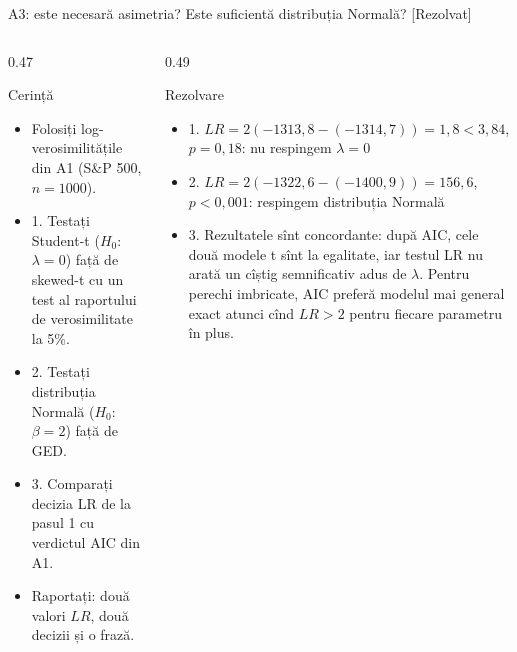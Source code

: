 \begin{frame}{A3: este necesară asimetria? Este suficientă distribuția Normală? [Rezolvat]}
\itemsize{\scriptsize}
\begin{columns}[T]
\begin{column}{0.47\textwidth}
\begin{block}{Cerință}
\begin{itemize}
    \item Folosiți log-verosimilitățile din A1 (S\&P 500, $n = 1000$).
    \item 1. Testați Student-t ($H_0$: $\lambda = 0$) față de skewed-t cu un test al raportului de verosimilitate la 5\%.
    \item 2. Testați distribuția Normală ($H_0$: $\beta = 2$) față de GED.
    \item 3. Comparați decizia LR de la pasul 1 cu verdictul AIC din A1.
    \item Raportați: două valori $LR$, două decizii și o frază.
\end{itemize}
\end{block}
\end{column}
\begin{column}{0.49\textwidth}
\begin{exampleblock}{Rezolvare}
\begin{itemize}
    \item 1. $LR = 2(-1313{,}8 - (-1314{,}7)) = 1{,}8 < 3{,}84$, $p = 0{,}18$: nu respingem $\lambda = 0$
    \item 2. $LR = 2(-1322{,}6 - (-1400{,}9)) = 156{,}6$, $p <0{,}001$: respingem distribuția Normală
    \item 3. Rezultatele sînt concordante: după AIC, cele două modele t sînt la egalitate, iar testul LR nu arată un cîștig semnificativ adus de $\lambda$. Pentru perechi imbricate, AIC preferă modelul mai general exact atunci cînd $LR > 2$ pentru fiecare parametru în plus.
\end{itemize}
\end{exampleblock}
\end{column}
\end{columns}
\end{frame}

